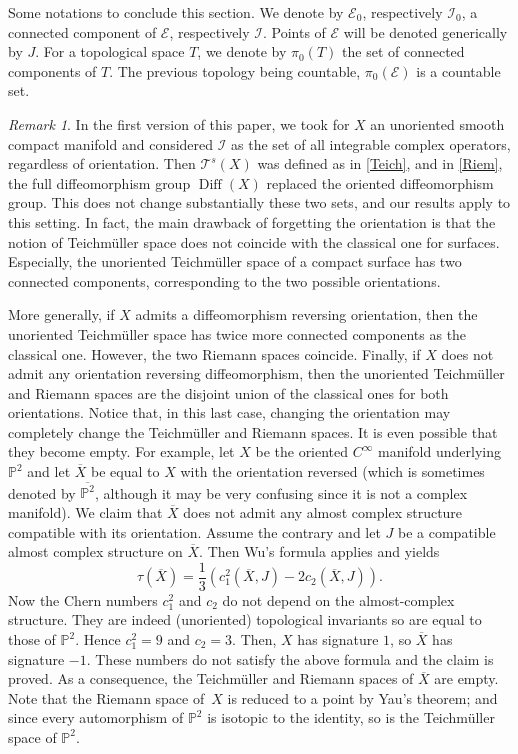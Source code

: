 \documentclass[10pt]{amsart}
\let\mathcal\mathscr
\DeclareMathOperator{\Diff}{Diff}
\theoremstyle{plain}
\theoremstyle{definition}
\theoremstyle{remark}
\newtheorem{remark}[theorem]{Remark}
\numberwithin{equation}{section}
\newcommand{\cI}{\mathcal{I}}
\begin{document}
Some notations to conclude this section. We denote by $\mathcal E_0$, respectively $\cI_0$, a connected component of $\mathcal E$, respectively $\cI$. Points of $\mathcal E$ will be denoted generically by $J$. For a topological space $T$, we denote by $\pi_0(T)$ the set of connected components of $T$. The previous topology being countable, $\pi_0(\mathcal E)$ is a countable set.
\begin{remark}
\label{oriented}
In the first version of this paper, we took for $X$ an unoriented smooth compact manifold and considered $\cI$ as the set of all integrable complex operators, regardless of orientation. Then $\mathcal T^s(X)$ was defined as in \eqref{Teich}, and in \eqref{Riem}, the full diffeomorphism group $\Diff(X)$ replaced the oriented diffeomorphism group. This does not change substantially these two sets, and our results apply to this setting. In fact, the main drawback of forgetting the orientation is that the notion of Teichmüller space does not coincide with the classical one for surfaces. Especially, the unoriented Teichmüller space of a compact surface has two connected components, corresponding to the two possible orientations.

More generally, if $X$ admits a diffeomorphism reversing orientation, then the unoriented Teichmüller space has twice more connected components as the classical one. However, the two Riemann spaces coincide. Finally, if $X$ does not admit any orientation reversing diffeomorphism, then the unoriented Teichmüller and Riemann spaces are the disjoint union of the classical ones for both orientations. Notice that, in this last case, changing the orientation may completely change the Teichmüller and \hbox{Riemann} spaces. It is even possible that they become empty. For example, let $X$ be the oriented $C^\infty$ manifold underlying $\mathbb P^2$ and let $\overline{X}$ be equal to $X$ with the orientation reversed (which is sometimes denoted by $\overline{\mathbb P^2}$, although it may be very confusing since it is not a complex manifold). We claim that $\overline{X}$ does not admit any almost complex structure compatible with its orientation. Assume the contrary and let $J$ be a compatible almost complex structure on $\overline{X}$. Then Wu's formula applies and yields
\begin{equation*}
\tau(\overline{X})=\dfrac{1}{3}(c_1^2(\overline{X},J)-2c_2(\overline{X},J)).
\end{equation*}
Now the Chern numbers $c_1^2$ and $c_2$ do not depend on the almost-complex structure. They are indeed (unoriented) topological invariants so are equal to those of $\mathbb P^2$. Hence $c_1^2=9$ and $c_2=3$. Then, $X$ has signature $1$, so $\overline{X}$ has signature $-1$. These numbers do not satisfy the above formula and the claim is proved. As a consequence, the Teichmüller and Riemann spaces of $\overline{X}$ are empty. Note that the Riemann space of~$X$ is reduced to a point by Yau's theorem; and since every automorphism of $\mathbb P^2$ is isotopic to the identity, so is the Teichmüller space of $\mathbb P^2$.
\end{remark}
\end{document}
